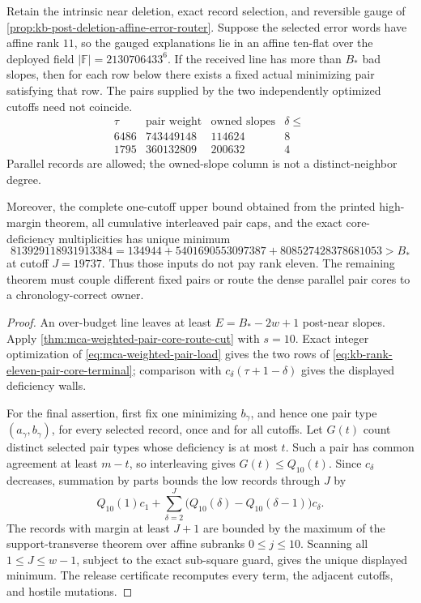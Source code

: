 \documentclass[11pt,a4paper]{amsart}
\numberwithin{equation}{section}
\theoremstyle{remark}
\newcommand{\F}{\mathbb F}\newcommand{\B}{\mathbb B}\newcommand{\K}{\mathbb K}\newcommand{\Z}{\mathbb Z}
\begin{document}
\begin{proposition}
\label{prop:kb-rank-eleven-pair-core-terminal}
Retain the intrinsic near deletion, exact record selection, and reversible
gauge of \cref{prop:kb-post-deletion-affine-error-router}.  Suppose the
selected error words have affine rank \(11\), so the gauged explanations
lie in an affine ten-flat over the deployed field
\(|\F|=2130706433^6\).  If the received line has more than \(B_*\) bad
slopes, then for each row below there exists a fixed actual minimizing pair
satisfying that row.  The pairs supplied by the two independently optimized
cutoffs need not coincide.
\[
\begin{array}{c|r|r|r}
 \tau&\text{pair weight}&\text{owned slopes}&\delta\le\ \\ \hline
 6486&743449148&114624&8\\
 1795&360132809&200632&4
\end{array}
\tag{PC11}\label{eq:kb-rank-eleven-pair-core-terminal}
\]
Parallel records are allowed; the owned-slope column is not a
distinct-neighbor degree.

Moreover, the complete one-cutoff upper bound obtained from the printed
high-margin theorem, all cumulative interleaved pair caps, and the exact
core-deficiency multiplicities has unique minimum
\[
 813929118931913384
 =134944+5401690553097387+808527428378681053
 >B_*
\]
at cutoff \(J=19737\).  Thus those inputs do not pay rank eleven.  The
remaining theorem must couple different fixed pairs or route the dense
parallel pair cores to a chronology-correct owner.
\end{proposition}

\begin{proof}
An over-budget line leaves at least
\(E=B_*-2w+1\) post-near slopes.  Apply
\cref{thm:mca-weighted-pair-core-route-cut} with \(s=10\).  Exact integer
optimization of \eqref{eq:mca-weighted-pair-load} gives the two rows of
\eqref{eq:kb-rank-eleven-pair-core-terminal}; comparison with
\(c_\delta(\tau+1-\delta)\) gives the displayed deficiency walls.

For the final assertion, first fix one minimizing \(b_\gamma\), and hence
one pair type \((a_\gamma,b_\gamma)\), for every selected record, once and
for all cutoffs.  Let \(G(t)\) count distinct selected pair types
whose deficiency is at most \(t\).  Such a pair has common agreement at
least \(m-t\), so interleaving gives \(G(t)\le Q_{10}(t)\).  Since
\(c_\delta\) decreases, summation by parts bounds the low records through
\(J\) by
\[
 Q_{10}(1)c_1+
 \sum_{\delta=2}^{J}
   \bigl(Q_{10}(\delta)-Q_{10}(\delta-1)\bigr)c_\delta.
\]
The records with margin at least \(J+1\) are bounded by the maximum of the
support-transverse theorem over affine subranks \(0\le j\le10\).  Scanning
all \(1\le J\le w-1\), subject to the exact sub-square guard, gives the
unique displayed minimum.  The release certificate recomputes every term,
the adjacent cutoffs, and hostile mutations.
\end{proof}
\end{document}
